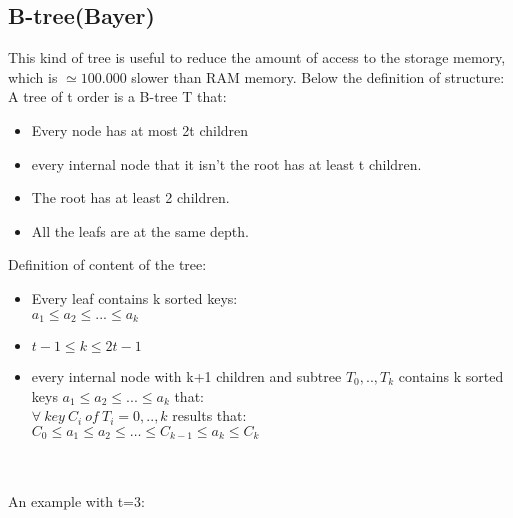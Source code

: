 \documentclass{article}
\begin{document}
\subsection{B-tree(Bayer)}
This kind of tree is useful to reduce the amount of access to the storage memory, which is $\simeq 100.000$ slower than RAM memory. Below the definition of structure:\\
A tree of t order is a B-tree T that:
\begin{itemize}
\item Every node has at most 2t children
\item every internal node that it isn't the root has at least t children.
\item The root has at least 2 children.
\item All the leafs are at the same depth.
\end{itemize}
\begin{large}
Definition of content of the tree:\\
\begin{itemize}
\item Every leaf contains k sorted keys: \\
$a_1 \leq a_2 \leq ... \leq a_k$
\item $t-1 \leq k \leq 2t-1$
\item every internal node with k+1 children and subtree $T_0,..,T_k$ contains k sorted keys $a_1 \leq a_2 \leq ... \leq a_k$ that:\\
$\forall \ key \ C_i \ of \ T_i=0,..,k $ results that:\\
$C_0 \leq a_1 \leq a_2 \leq \ldots \leq C_{k-1} \leq a_k \leq C_k$
\end{itemize}
\end{large} \leavevmode \\ \\
An example with t=3:\\
\end{document}
